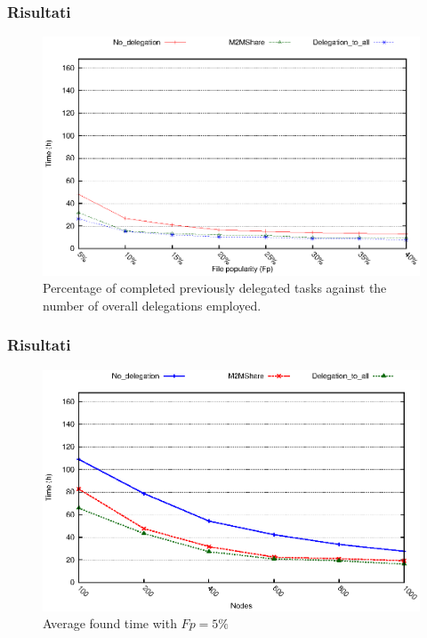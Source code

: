 \documentclass{beamer}
\begin{document}
\begin{frame}
\frametitle{Risultati}
\begin{center}
\begin{figure}[ht]
\includegraphics[scale=0.7]{../grafici/tempiVFDiversaPop.eps}
    \caption{Percentage of completed previously delegated tasks against the number of overall delegations employed.}
\end{figure}
\end{center}
\end{frame}

\begin{frame}
\frametitle{Risultati}
\begin{center}
\begin{figure}[ht]
\includegraphics[scale=0.7]{../grafici/tempiVF_Fp5.eps}
\caption{Average found time with $Fp = 5\%$}
\end{figure}
\end{center}
\end{frame}
\end{document}

